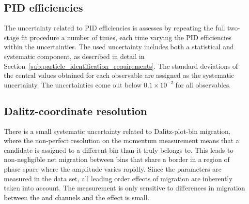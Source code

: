 \subsection{PID efficiencies} %
\label{sub:pid_efficiency_systematic}
The uncertainty related to PID efficiencies is assesses by repeating the full two-stage fit procedure a number of times, each time varying the PID efficiencies within the uncertainties. The used uncertainty includes both a statistical and systematic component, as described in detail in Section~\ref{sub:particle_identification_requirements}. The standard deviations of the central values obtained for each observable are assigned as the systematic uncertainty. The uncertainties come out below $0.1\times 10^{-2}$ for all observables.

\subsection{Dalitz-coordinate resolution} %
\label{sub:dalitz_plot_bin_migration}

There is a small systematic uncertainty related to Dalitz-plot-bin migration, where the non-perfect resolution on the momentum measurement means that a candidate is assigned to a different bin than it truly belongs to. This leads to non-negligible net migration between bins that share a border in a region of phase space where the amplitude varies rapidly. Since the \Fi parameters are measured in the data set, all leading order effects of migration are inherently taken into account. The measurement is only sensitive to differences in migration between the \DK and \Dpi channels and the effect is small. 

